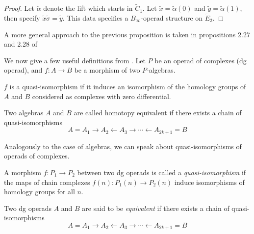 \documentclass[TFM.tex]{subfiles}
\begin{document}
\begin{proof}
Let $\widetilde{\alpha}$ denote the lift which starts in $\widetilde{C}_1$. Let $\widetilde{x}=\widetilde{\alpha}(0)$ and $\widetilde{y}=\widetilde{\alpha}(1)$, then specify $\widetilde{x}\widetilde{\sigma}=\widetilde{y}$. %
This data specifies a $B_\infty$-operad structure on $\widetilde{E}_2$. 
\end{proof}

A more general approach to the previous proposition is taken in propositions 2.27 and 2.28 of \cite{tesis}

We now give a few useful definitions from \cite[]{Kontsevich}. Let $P$ be an operad of complexes (dg operad), and $f : A→B$ be a morphism of two $P$-algebras.
\begin{defi}
$f$ is a quasi-isomorphism if it induces an isomorphism of the homology
groups of $A$ and $B$ considered as complexes with zero differential.
\end{defi}

\begin{defi}
Two algebras $A$ and $B$ are called homotopy equivalent if there exists a chain of quasi-isomorphisms
\[
A= A_1→A_2←A_3→\cdots←A_{2k+1} = B
\]
\end{defi}

Analogously to the case of algebras, we can speak about quasi-isomorphisms of operads
of complexes.

\begin{defi}
A morphism $f : P_1→P_2$ between two dg operads is called a
\emph{quasi-isomorphism} if the maps of chain complexes $f(n) : P_1(n)→P_2(n)$ induce isomorphisms of
homology groups for all $n$.
\end{defi}

\begin{defi}
Two dg operads $A$ and $B$ are said to be \emph{equivalent} if there exists a chain of quasi-isomorphisms
\[
A= A_1→A_2←A_3→\cdots←A_{2k+1} = B
\]
\end{defi}
\end{document}
